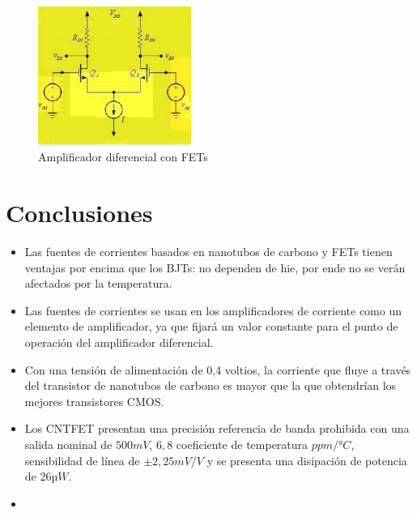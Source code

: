 \documentclass[conference]{IEEEtran} %
\begin{document}
\begin{figure}
	\centering
	\includegraphics[width=5cm]{IMAGENES/image5.png}
	\caption{Amplificador diferencial con FETs}
\end{figure}




\section{Conclusiones}

\begin{itemize}
	\item Las fuentes de corrientes   basados en nanotubos de carbono y FETs tienen ventajas por encima que los BJTs: no dependen de hie, por ende no se verán afectados por la temperatura.
	
	\item Las fuentes de corrientes se usan en los amplificadores de corriente como un elemento de amplificador, ya que fijará un valor constante para el punto de operación del amplificador diferencial.
	
	\item Con una tensión de alimentación de 0,4 voltios, la corriente que fluye a través del transistor de nanotubos de carbono es mayor que la que obtendrían los mejores transistores CMOS.
	
	\item Los CNTFET presentan una precisión referencia de banda prohibida con una salida nominal de $500 mV$, $6,8$ coeficiente de temperatura $ppm/°C$, sensibilidad de línea de $±2,25 mV/V$
	y se presenta una disipación de potencia de $26 µW$. 
	
	
	\item 
\end{itemize}



 




\end{document}
